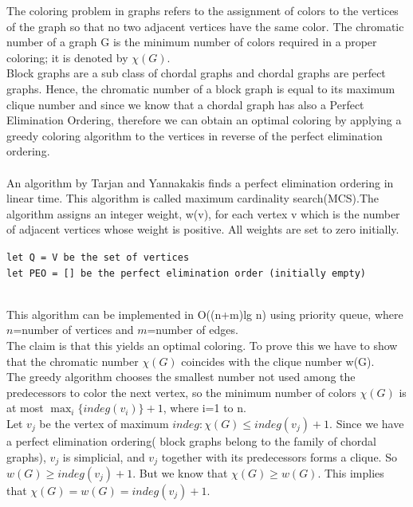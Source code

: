 \documentclass{memoir}
\begin{document}
The coloring problem in graphs refers to the assignment of colors to the vertices of the graph so that no two adjacent vertices have the same color. The chromatic number of a graph G is the minimum number of colors required in a proper coloring; it is denoted by \begin{math} \chi (G). \end{math}
\\ Block graphs are a sub class of chordal graphs and chordal graphs are perfect graphs. Hence, the chromatic number of a block graph is equal to its maximum clique number and since we know that a chordal graph has also a Perfect Elimination Ordering, therefore we can obtain an optimal coloring by applying a greedy coloring algorithm to the vertices in reverse of the perfect elimination ordering.
\\
\\An algorithm by Tarjan and Yannakakis finds a perfect elimination ordering in linear time. This algorithm is called maximum cardinality search(MCS).The algorithm assigns an integer weight, w(v), for each vertex v  which is the number of adjacent vertices whose weight is positive. All weights are set to zero initially.
\begin{center}
    \begin{algorithmic}
                \SetAlgoLined
                \texttt{let Q = V be the set of vertices\\
                let PEO = [] be the perfect elimination order (initially empty)\\
                }
    \end{algorithmic}
\end{center}

\\This algorithm can be implemented in O((n+m)lg n) using priority queue, where $n$=number of vertices and $m$=number of edges.
\\The claim is that this yields an optimal coloring. To prove this we have to show that the chromatic number $\chi(G)$ coincides with the clique number w(G).
\\The greedy algorithm chooses the smallest number not used among the predecessors to color the next vertex,  so the minimum number of colors $\chi(G)$ is at most $\max_i\{indeg(v_i)\}+1$, where i=1 to n.
\\Let $v_j$ be the vertex of maximum $indeg: \chi(G) \le indeg(v_j)+1$. Since we have a perfect elimination ordering( block graphs belong to the family of chordal graphs), $v_j$ is simplicial, and $v_j$ together with its predecessors forms a clique. So $w(G) \ge indeg(v_j)+1$. But we know that $\chi(G) \ge w(G)$. This implies that $\chi(G)=w(G)=indeg(v_j)+1$.
\end{document}
